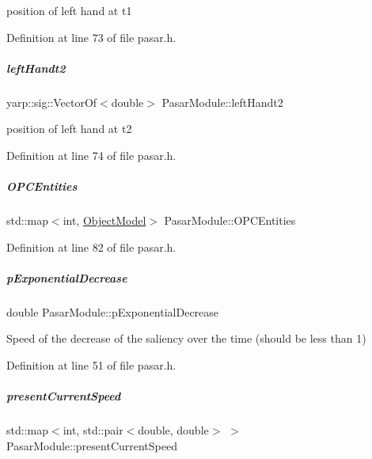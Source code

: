 position of left hand at t1 



Definition at line 73 of file pasar.\+h.

\mbox{\label{group__pasar_a495a4143156903eabb2ab4450bf3007f}} 
\subparagraph{\texorpdfstring{left\+Handt2}{leftHandt2}}
{\footnotesize\ttfamily yarp\+::sig\+::\+Vector\+Of$<$double$>$ Pasar\+Module\+::left\+Handt2\hspace{0.3cm}{\ttfamily [protected]}}



position of left hand at t2 



Definition at line 74 of file pasar.\+h.

\mbox{\label{group__pasar_a0d58b73edb50621d08296ec966ecba86}} 
\subparagraph{\texorpdfstring{O\+P\+C\+Entities}{OPCEntities}}
{\footnotesize\ttfamily std\+::map$<$int, \hyperlink{group__pasar_structObjectModel}{Object\+Model}$>$ Pasar\+Module\+::\+O\+P\+C\+Entities\hspace{0.3cm}{\ttfamily [protected]}}



Definition at line 82 of file pasar.\+h.

\mbox{\label{group__pasar_a911cdea1fc39d0c2e1dc30fa8b29f10b}} 
\subparagraph{\texorpdfstring{p\+Exponential\+Decrease}{pExponentialDecrease}}
{\footnotesize\ttfamily double Pasar\+Module\+::p\+Exponential\+Decrease\hspace{0.3cm}{\ttfamily [protected]}}



Speed of the decrease of the saliency over the time (should be less than 1) 



Definition at line 51 of file pasar.\+h.

\mbox{\label{group__pasar_a704006bef0d56f1b7b0050d2e32b23cd}} 
\subparagraph{\texorpdfstring{present\+Current\+Speed}{presentCurrentSpeed}}
{\footnotesize\ttfamily std\+::map$<$int, std\+::pair$<$double, double$>$ $>$ Pasar\+Module\+::present\+Current\+Speed\hspace{0.3cm}{\ttfamily [protected]}}



